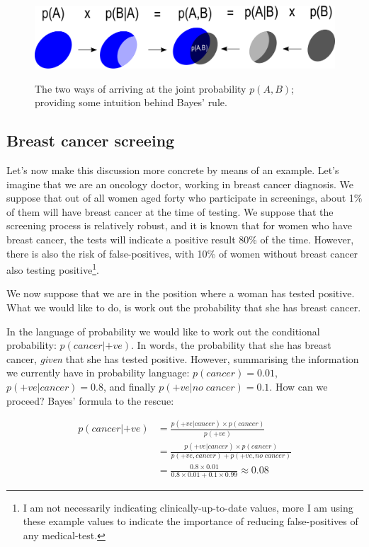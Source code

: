 \documentclass[11pt,fullpage]{book}
\begin{document}
\begin{figure}
\centering
\scalebox{0.4} 
{\includegraphics{Probability_BayesianIntuition.pdf}}
\caption{The two ways of arriving at the joint probability $p(A,B)$; providing some intuition behind Bayes' rule.}\label{fig:Probability_BayesianIntuition}
\end{figure}

\subsection{Breast cancer screeing}
Let's now make this discussion more concrete by means of an example. Let's imagine that we are an oncology doctor, working in breast cancer diagnosis. We suppose that out of all women aged forty who participate in screenings, about 1\% of them will have breast cancer at the time of testing. We suppose that the screening process is relatively robust, and it is known that for women who have breast cancer, the tests will indicate a positive result 80\% of the time. However, there is also the risk of false-positives, with 10\% of women without breast cancer also testing positive\footnote{I am not necessarily indicating clinically-up-to-date values, more I am using these example values to indicate the importance of reducing false-positives of any medical-test.}.

We now suppose that we are in the position where a woman has tested positive. What we would like to do, is work out the probability that she has breast cancer.

In the language of probability we would like to work out the conditional probability: $p(cancer|+ve)$. In words, the probability that she has breast cancer, \textit{given} that she has tested positive. However, summarising the information we currently have in probability language: $p(cancer)=0.01$, $p(+ve|cancer)=0.8$, and finally $p(+ve|no\; cancer) = 0.1$. How can we proceed? Bayes' formula to the rescue:

\begin{equation}\label{eq:Probability_bayesBreastCancer}
\begin{align}
p(cancer|+ve) &= \frac{p(+ve|cancer)\times p(cancer)}{p(+ve)}\\
&= \frac{p(+ve|cancer)\times p(cancer)}{p(+ve,cancer)+p(+ve,no\;cancer)}\\
&= \frac{0.8\times 0.01}{0.8\times 0.01 + 0.1\times 0.99} \approx 0.08
\end{align}
\end{equation}
\end{document}
